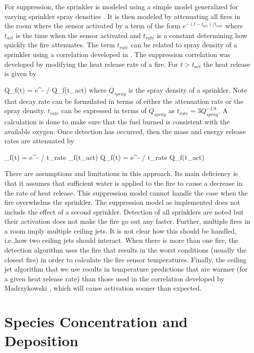 For suppression, the sprinkler is modeled using a simple model \cite{Madrzykowski:1992} generalized for varying sprinkler spray densities \cite{Evans:1993}. It is then modeled by attenuating all fires in the room where the sensor activated by a term of the form $e^{-(t-t_{act})/t_{rate}}$ where $t_{act}$ is the time when the sensor activated and $t_{rate}$ is a constant determining how quickly the fire attenuates. The term $t_{rate}$ can be related to spray density of a sprinkler using a correlation developed in \cite{Evans:1993}. The suppression correlation was developed by modifying the heat release rate of a fire. For $t > t_{act}$ the heat release is given by

\be Q_f(t) = e^{- / } Q_f(t_{act}) \ee
where $Q_{spray}$ is the spray density of a sprinkler. Note that decay rate can be formulated in terms of either the attenuation rate or the spray density. $t_{rate}$ can be expressed in terms of $Q_{spray}$ as $t_{rate} = 3Q_{spray}^{-1.8}$. A calculation is done to make sure that the fuel burned is consistent with the available oxygen. Once detection has occurred, then the mass and energy release rates are attenuated by

\be {}_f(t) = e^{- / t_{rate}} _f(t_{act}) \ee
\be Q_f(t) = e^{- / t_{rate}} Q_f(t_{act}) \ee

There are assumptions and limitations in this approach. Its main deficiency is that it assumes that sufficient water is applied to the fire to cause a decrease in the rate of heat release. This suppression model cannot handle the case when the fire overwhelms the sprinkler.  The suppression model as implemented does not include the effect of a second sprinkler. Detection of all sprinklers are noted but their activation does not make the fire go out any faster. Further, multiple fires in a room imply multiple ceiling jets. It is not clear how this should be handled, i.e.,how two ceiling jets should interact. When there is more than one fire, the detection algorithm uses the fire that results in the worst conditions (usually the closest fire) in order to calculate the fire sensor temperatures.  Finally, the ceiling jet algorithm that we use results in temperature predictions that are warmer (for a given heat release rate) than those used in the correlation developed by Madrzykowski \cite{Madrzykowski:1995}, which will cause activation sooner than expected.

\section{Species Concentration and Deposition}

